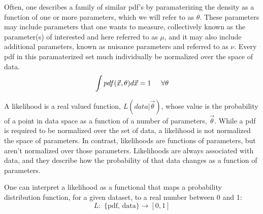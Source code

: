 Often, one describes a family of similar pdf's by paramaterizing the density as a function of one or more parameters, which we will refer to as $\theta$.
These parameters may include parameters that one wants to measure, collectively known as the parameter(s) of interested and here referred to as $\mu$, and it may also include additional parameters, known as nuisance parameters and referred to as $\nu$. %
Every pdf in this paramaterized set much individually be normalized over the space of data. 
\begin{equation}
  \int pdf(\vec{x}, \theta) d\vec{x} = 1 \hspace{5mm} \forall \theta %
\end{equation}

A likelihood is a real valued function, $L(data | \vec{\theta})$, whose value is the probability of a point in data space as a function of a number of parameters, $\vec{\theta}$.
While a pdf is required to be normalized over the set of data, a likelihood is not normalized the space of parameters.
In contrast, likelihoods are functions of parameters, but aren't normalized over those parameters.
Likelihoods are always associated with data, and they describe how the probability of that data changes as a function of parameters.

One can interpret a likelihood as a functional that maps a probability distribution function, for a given dataset, to a real number between 0 and 1:
\begin{equation}
  L: \text{ \{pdf, data\} } \rightarrow [0, 1]%
\end{equation}


